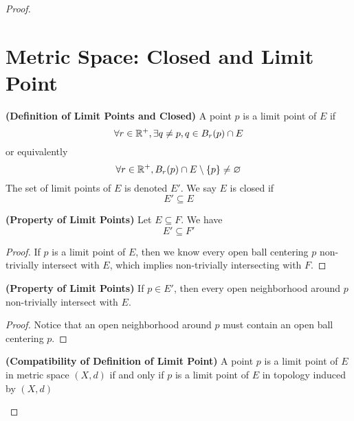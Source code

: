 \documentclass{report}
\begin{document}
\begin{proof}
\section{Metric Space: Closed and Limit Point}
\begin{definition}
\label{1.6.1}
\textbf{(Definition of Limit Points and Closed)} A point $p$ is a limit point of $E$ if 
 \begin{equation}
\forall r\in\mathbb{R}^+, \exists q\neq p, q\in B_r(p) \cap E
\end{equation}
or equivalently 
\begin{equation}
\forall r\in\mathbb{R}^+, B_r(p)\cap E\setminus \{ p \}\neq \varnothing
\end{equation}
The set of limit points of  $E$ is denoted $E'$. We say $E$ is closed if 
\begin{equation}
E'\subseteq E
\end{equation}
\end{definition}
\begin{theorem}
\label{1.6.2}
\textbf{(Property of Limit Points)} Let $E\subseteq F$. We have
\begin{equation}
E'\subseteq F'
\end{equation}
\end{theorem}
\begin{proof}
If $p$ is a limit point of $E$, then we know every open ball centering $p$ non-trivially intersect with  $E$, which implies non-trivially intersecting with $F$. 
\end{proof}
\begin{theorem}
\label{1.6.3}
\textbf{(Property of Limit Points)} If $p \in E'$, then every open neighborhood around $p$ non-trivially intersect with  $E$.
\end{theorem}
\begin{proof}
  Notice that an open neighborhood around $p$ must contain an open ball centering $p$.
\end{proof}
\begin{theorem}
\label{1.6.4}
\textbf{(Compatibility of Definition of Limit Point)} A point $p$ is a limit point of $E$ in metric space $(X,d)$ if and only if  $p$ is a limit point of $E$ in topology induced by $(X,d)$ 

\end{theorem}
\end{proof}
\end{document}
